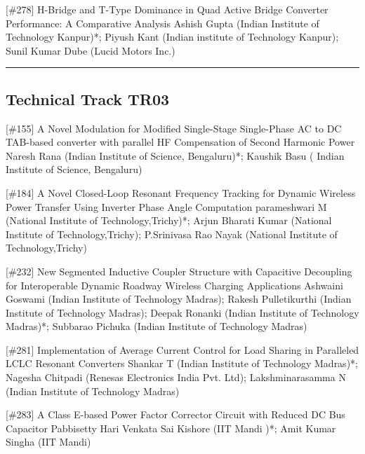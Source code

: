 {} \begin{abstract_online} {[\#278] H-Bridge and T-Type Dominance in Quad Active Bridge Converter Performance: A Comparative Analysis} {} {Ashish Gupta (Indian Institute of Technology Kanpur)*; Piyush Kant (Indian institute of Technology Kanpur); Sunil Kumar Dube (Lucid Motors Inc.)} {}  \end{abstract_online} 
\hrule  \subsection{Technical Track TR03}\nopagebreak {} \begin{abstract_online} {[\#155] A Novel Modulation for Modified Single-Stage Single-Phase AC to DC TAB-based converter with parallel HF Compensation of Second Harmonic Power} {} {Naresh Rana (Indian Institute of Science, Bengaluru)*; Kaushik Basu ( Indian Institute of Science, Bengaluru)} {}  \end{abstract_online} 
{} \begin{abstract_online} {[\#184] A Novel Closed-Loop Resonant Frequency Tracking for Dynamic Wireless Power Transfer Using Inverter Phase Angle Computation} {} {parameshwari M (National Institute of Technology,Trichy)*; Arjun Bharati  Kumar (National Institute of Technology,Trichy); P.Srinivasa Rao  Nayak (National Institute of Technology,Trichy)} {}  \end{abstract_online} 
{} \begin{abstract_online} {[\#232] New Segmented Inductive Coupler Structure with Capacitive Decoupling for Interoperable Dynamic Roadway Wireless Charging Applications} {} {Ashwaini Goswami (Indian Institute of Technology Madras); Rakesh Pulletikurthi (Indian Institute of Technology Madras); Deepak  Ronanki (Indian Institute of Technology Madras)*; Subbarao Pichuka (Indian Institute of Technology Madras)} {}  \end{abstract_online} 
{} \begin{abstract_online} {[\#281] Implementation of Average Current Control for Load Sharing in Paralleled LCLC Resonant Converters} {} {Shankar T (Indian Institute of Technology Madras)*; Nagesha Chitpadi (Renesas Electronics India Pvt. Ltd); Lakshminarasamma N (Indian Institute of Technology Madras)} {}  \end{abstract_online} 
{} \begin{abstract_online} {[\#283] A Class E-based Power Factor Corrector Circuit  with Reduced DC Bus Capacitor} {} {Pabbisetty  Hari Venkata Sai Kishore  (IIT Mandi )*; Amit Kumar Singha (IIT Mandi)} {}  \end{abstract_online} 
